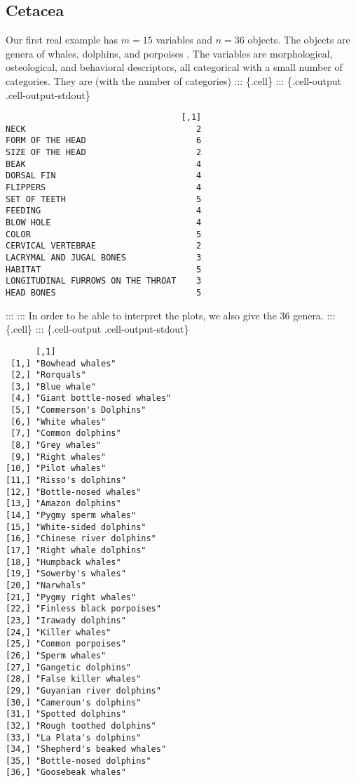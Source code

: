 \documentclass[
  12pt,
  letterpaper,
  DIV=11,
  numbers=noendperiod]{scrartcl}
\begin{document}
\subsection{Cetacea}\label{cetacea}

Our first real example has \(m=15\) variables and \(n=36\) objects. The
objects are genera of whales, dolphins, and porpoises . The variables
are morphological, osteological, and behavioral descriptors, all
categorical with a small number of categories. They are (with the number
of categories) ::: \{.cell\} ::: \{.cell-output .cell-output-stdout\}

\begin{verbatim}
                                   [,1]
NECK                                  2
FORM OF THE HEAD                      6
SIZE OF THE HEAD                      2
BEAK                                  4
DORSAL FIN                            4
FLIPPERS                              4
SET OF TEETH                          5
FEEDING                               4
BLOW HOLE                             4
COLOR                                 5
CERVICAL VERTEBRAE                    2
LACRYMAL AND JUGAL BONES              3
HABITAT                               5
LONGITUDINAL FURROWS ON THE THROAT    3
HEAD BONES                            5
\end{verbatim}

::: ::: In order to be able to interpret the plots, we also give the 36
genera. ::: \{.cell\} ::: \{.cell-output .cell-output-stdout\}

\begin{verbatim}
      [,1]                       
 [1,] "Bowhead whales"           
 [2,] "Rorquals"                 
 [3,] "Blue whale"               
 [4,] "Giant bottle-nosed whales"
 [5,] "Commerson's Dolphins"     
 [6,] "White whales"             
 [7,] "Common dolphins"          
 [8,] "Grey whales"              
 [9,] "Right whales"             
[10,] "Pilot whales"             
[11,] "Risso's dolphins"         
[12,] "Bottle-nosed whales"      
[13,] "Amazon dolphins"          
[14,] "Pygmy sperm whales"       
[15,] "White-sided dolphins"     
[16,] "Chinese river dolphins"   
[17,] "Right whale dolphins"     
[18,] "Humpback whales"          
[19,] "Sowerby's whales"         
[20,] "Narwhals"                 
[21,] "Pygmy right whales"       
[22,] "Finless black porpoises"  
[23,] "Irawady dolphins"         
[24,] "Killer whales"            
[25,] "Common porpoises"         
[26,] "Sperm whales"             
[27,] "Gangetic dolphins"        
[28,] "False killer whales"      
[29,] "Guyanian river dolphins"  
[30,] "Cameroun's dolphins"      
[31,] "Spotted dolphins"         
[32,] "Rough toothed dolphins"   
[33,] "La Plata's dolphins"      
[34,] "Shepherd's beaked whales" 
[35,] "Bottle-nosed dolphins"    
[36,] "Goosebeak whales"         
\end{verbatim}
\end{document}
